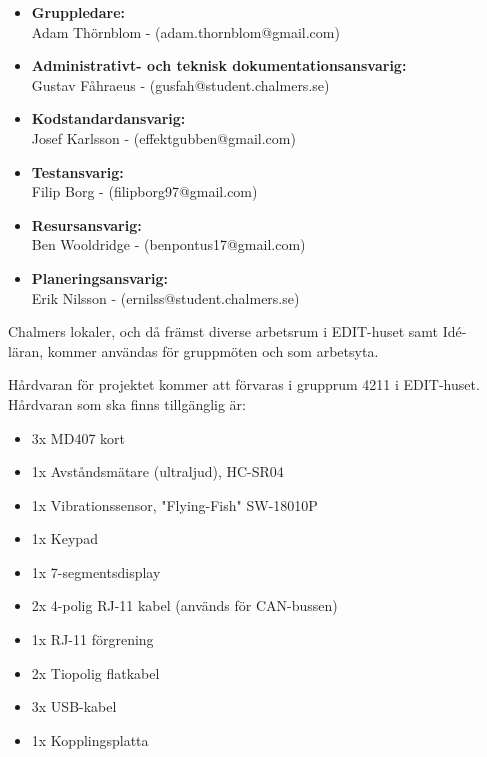 \documentclass[a4paper]{article}
\begin{document}
\begin{itemize}
    \item \textbf{Gruppledare:}
    \\
    Adam Thörnblom - (adam.thornblom@gmail.com)

    \item \textbf{Administrativt- och teknisk dokumentationsansvarig:}
    \\
    Gustav Fåhraeus - (gusfah@student.chalmers.se)

    \item \textbf{Kodstandardansvarig:}
    \\
    Josef Karlsson - (effektgubben@gmail.com)

    \item \textbf{Testansvarig:}
    \\
    Filip Borg - (filipborg97@gmail.com)

    \item \textbf{Resursansvarig:}
    \\
    Ben Wooldridge - (benpontus17@gmail.com)

    \item \textbf{Planeringsansvarig:}
    \\
    Erik Nilsson - (ernilss@student.chalmers.se)
\end{itemize}

Chalmers lokaler, och då främst diverse arbetsrum i EDIT-huset samt Idé-\\läran, kommer användas för gruppmöten och som arbetsyta.

Hårdvaran för projektet kommer att förvaras i grupprum 4211 i EDIT-huset. Hårdvaran som ska finns tillgänglig är:
\begin{itemize}
    \item 3x MD407 kort
    \item 1x Avståndsmätare (ultraljud), HC-SR04
    \item 1x Vibrationssensor, "Flying-Fish" SW-18010P
    \item 1x Keypad
    \item 1x 7-segmentsdisplay
    \item 2x 4-polig RJ-11 kabel (används för CAN-bussen)
    \item 1x RJ-11 förgrening
    \item 2x Tiopolig flatkabel
    \item 3x USB-kabel
    \item 1x Kopplingsplatta
\end{itemize}
\end{document}
